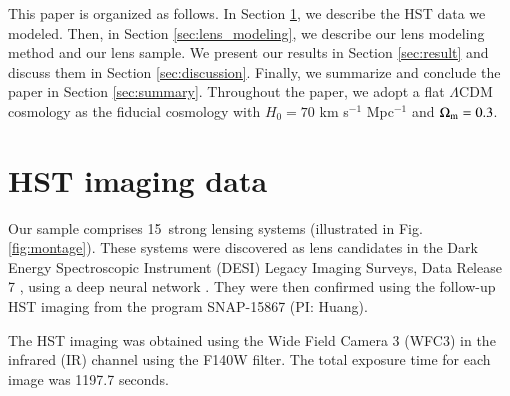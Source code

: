 \documentclass{aa}
\newcommand{\nlens}{15}
\newcommand{\newedit}[1]{{#1}} %
\begin{document}

This paper is organized as follows. In Section \ref{sec:data}, we describe the HST data we modeled. Then, in Section \ref{sec:lens_modeling}, we describe our lens modeling method and our lens sample. We present our results in Section \ref{sec:result} and discuss them in Section \ref{sec:discussion}. Finally, we summarize and conclude the paper in Section \ref{sec:summary}. Throughout the paper, we adopt a flat $\Lambda$CDM cosmology as the fiducial cosmology with $H_0= 70$ km s$^{-1}$ Mpc$^{-1}$ and $\Omega_{\rm m} = 0.3$.

\section{HST imaging data} \label{sec:data}

Our sample comprises \nlens\ strong lensing systems (illustrated in Fig. \ref{fig:montage}). These systems were discovered as lens candidates in the Dark Energy Spectroscopic Instrument (DESI) Legacy Imaging Surveys, Data Release 7 \citep{2019AJ....157..168DNew}, using a deep neural network \citep{2020ApJ...894...78H}. They were then confirmed using the follow-up HST imaging from the program SNAP-15867 (PI: Huang).

The HST imaging was obtained using the Wide Field Camera 3 (WFC3) in the infrared (IR) channel using the F140W filter. The total exposure time for each image was 1197.7 \newedit{seconds}. %
\end{document}
